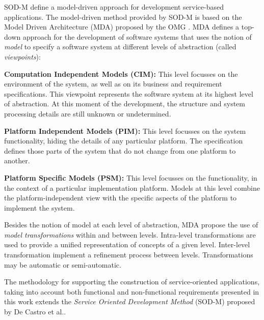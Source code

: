 



SOD-M define a model-driven approach for development service-based applications. The model-driven method provided by SOD-M is based on the Model Driven Architecture (MDA) proposed by the OMG \cite{miller}. MDA defines a top-down approach for the development of software systems that uses the notion of \textit{model} to specify a software system at different levels of abstraction (called \textit{viewpoints}):

\begin{trivlist}
\item \textbf{Computation Independent Models (CIM):} This level focusses on the
environment of the system, as well as on its business and requirement specifications.
This viewpoint represents the software system at its highest level of abstraction.
At this moment of the development, the structure and system processing details are still unknown or undetermined.

\item \textbf{Platform Independent Models (PIM):} This level focusses on the system functionality, hiding the details of any particular platform.
The specification defines those parts of the system that do not change from one platform to another.

\item \textbf{Platform Specific Models (PSM):} This level focusses on the functionality, in the context of a particular implementation platform.
Models at this level combine the platform-independent view with the specific aspects of the platform to implement the system.
\end{trivlist}

Besides the notion of model at each level of abstraction, MDA propose the use of \textit{model transformations} within and between levels. Intra-level transformations are used to provide a unified representation of concepts of a given level. Inter-level transformation implement a refinement process between levels. Transformations may be automatic or semi-automatic.


The methodology for supporting the construction of service-oriented applications, taking into account both functional and non-functional requirements presented in this work extends the \textit{Service Oriented Development Method} (SOD-M) proposed by De Castro et al.\cite{decastro1}.
